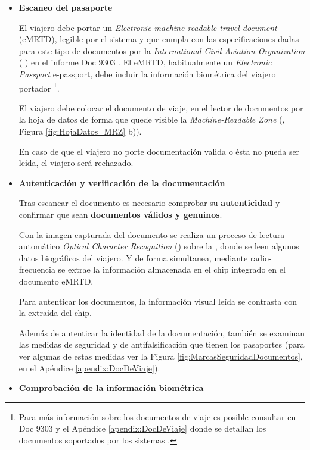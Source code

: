 \begin{itemize}
    \item 
    \textbf{Escaneo del pasaporte} 
    
    El viajero debe portar un \textit{Electronic machine-readable travel document} (\gls{eMRTD}), legible por el sistema y que cumpla con las especificaciones dadas para este tipo de documentos por la \textit{International Civil Aviation Organization} ( \cite{ICAOOnline}) en el informe  Doc $9303$ \cite{doc20069303}. El \gls{eMRTD}, habitualmente un \textit{Electronic Passport} \gls{e-passport}, debe incluir la información biométrica del viajero portador \footnote{Para más información sobre los documentos de viaje es posible consultar en -Doc $9303$ \cite{doc20069303} y el Apéndice \ref{apendix:DocDeViaje} donde se detallan los documentos soportados por los sistemas .}.
    
    El viajero debe colocar el documento de viaje, en el lector de documentos por la hoja de datos de forma que quede visible la \textit{Machine-Readable Zone} (, Figura \ref{fig:HojaDatos_MRZ} b)). 
    
    En caso de que el viajero no porte documentación valida o ésta no pueda ser leída, el viajero será rechazado.
    
    \item
    \textbf{Autenticación y verificación de la documentación}
    
    Tras escanear el documento es necesario comprobar su \textbf{autenticidad} y confirmar que sean \textbf{documentos válidos y genuinos}. 
    
    Con la imagen capturada del documento se realiza un proceso de lectura automático \textit{Optical Character Recognition} () sobre la , donde se leen algunos datos biográficos del viajero. Y de forma simultanea, mediante radio-frecuencia se extrae la información almacenada en el chip  integrado en el documento \gls{eMRTD}. 
    
    Para autenticar los documentos, la información visual leída se contrasta con la extraída del chip.

    Además de autenticar la identidad de la documentación, también se examinan las medidas de seguridad y de antifalsificación que tienen los pasaportes (para ver algunas de estas medidas ver la Figura \ref{fig:MarcasSeguridadDocumentos}, en el Apéndice  \ref{apendix:DocDeViaje}).
    
    \item
    \textbf{Comprobación de la información biométrica}
    

\end{itemize}
